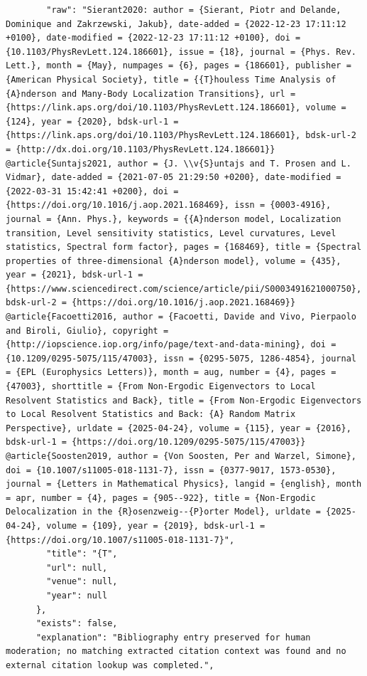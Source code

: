 \documentclass[11pt]{article}
\begin{document}
\begin{verbatim}
        "raw": "Sierant2020: author = {Sierant, Piotr and Delande, Dominique and Zakrzewski, Jakub}, date-added = {2022-12-23 17:11:12 +0100}, date-modified = {2022-12-23 17:11:12 +0100}, doi = {10.1103/PhysRevLett.124.186601}, issue = {18}, journal = {Phys. Rev. Lett.}, month = {May}, numpages = {6}, pages = {186601}, publisher = {American Physical Society}, title = {{T}houless Time Analysis of {A}nderson and Many-Body Localization Transitions}, url = {https://link.aps.org/doi/10.1103/PhysRevLett.124.186601}, volume = {124}, year = {2020}, bdsk-url-1 = {https://link.aps.org/doi/10.1103/PhysRevLett.124.186601}, bdsk-url-2 = {http://dx.doi.org/10.1103/PhysRevLett.124.186601}} @article{Suntajs2021, author = {J. \\v{S}untajs and T. Prosen and L. Vidmar}, date-added = {2021-07-05 21:29:50 +0200}, date-modified = {2022-03-31 15:42:41 +0200}, doi = {https://doi.org/10.1016/j.aop.2021.168469}, issn = {0003-4916}, journal = {Ann. Phys.}, keywords = {{A}nderson model, Localization transition, Level sensitivity statistics, Level curvatures, Level statistics, Spectral form factor}, pages = {168469}, title = {Spectral properties of three-dimensional {A}nderson model}, volume = {435}, year = {2021}, bdsk-url-1 = {https://www.sciencedirect.com/science/article/pii/S0003491621000750}, bdsk-url-2 = {https://doi.org/10.1016/j.aop.2021.168469}} @article{Facoetti2016, author = {Facoetti, Davide and Vivo, Pierpaolo and Biroli, Giulio}, copyright = {http://iopscience.iop.org/info/page/text-and-data-mining}, doi = {10.1209/0295-5075/115/47003}, issn = {0295-5075, 1286-4854}, journal = {EPL (Europhysics Letters)}, month = aug, number = {4}, pages = {47003}, shorttitle = {From Non-Ergodic Eigenvectors to Local Resolvent Statistics and Back}, title = {From Non-Ergodic Eigenvectors to Local Resolvent Statistics and Back: {A} Random Matrix Perspective}, urldate = {2025-04-24}, volume = {115}, year = {2016}, bdsk-url-1 = {https://doi.org/10.1209/0295-5075/115/47003}} @article{Soosten2019, author = {Von Soosten, Per and Warzel, Simone}, doi = {10.1007/s11005-018-1131-7}, issn = {0377-9017, 1573-0530}, journal = {Letters in Mathematical Physics}, langid = {english}, month = apr, number = {4}, pages = {905--922}, title = {Non-Ergodic Delocalization in the {R}osenzweig--{P}orter Model}, urldate = {2025-04-24}, volume = {109}, year = {2019}, bdsk-url-1 = {https://doi.org/10.1007/s11005-018-1131-7}",
        "title": "{T",
        "url": null,
        "venue": null,
        "year": null
      },
      "exists": false,
      "explanation": "Bibliography entry preserved for human moderation; no matching extracted citation context was found and no external citation lookup was completed.",

\end{verbatim}
\end{document}
